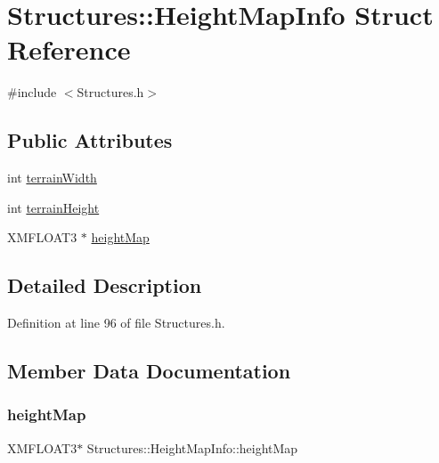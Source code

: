 \hypertarget{struct_structures_1_1_height_map_info}{}\section{Structures\+:\+:Height\+Map\+Info Struct Reference}
\label{struct_structures_1_1_height_map_info}


{\ttfamily \#include $<$Structures.\+h$>$}

\subsection*{Public Attributes}
\begin{DoxyCompactItemize}
\item 
int \mbox{\hyperlink{struct_structures_1_1_height_map_info_ae386b6bebf726c232565eecb66605fd1}{terrain\+Width}}
\item 
int \mbox{\hyperlink{struct_structures_1_1_height_map_info_a32b0e9818a27f3486e082d010675029d}{terrain\+Height}}
\item 
X\+M\+F\+L\+O\+A\+T3 $\ast$ \mbox{\hyperlink{struct_structures_1_1_height_map_info_aaeff9f1c93664399e65bf364e379e2f5}{height\+Map}}
\end{DoxyCompactItemize}


\subsection{Detailed Description}


Definition at line 96 of file Structures.\+h.



\subsection{Member Data Documentation}
\mbox{\label{struct_structures_1_1_height_map_info_aaeff9f1c93664399e65bf364e379e2f5}} 
\subsubsection{\texorpdfstring{height\+Map}{heightMap}}
{\footnotesize\ttfamily X\+M\+F\+L\+O\+A\+T3$\ast$ Structures\+::\+Height\+Map\+Info\+::height\+Map}



